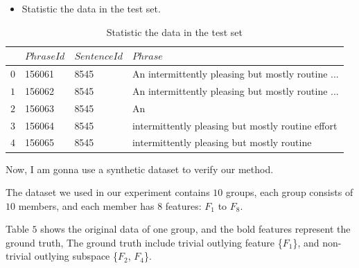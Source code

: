 \documentclass[
 size=14pt,
 paper=smartboard,  %
 mode=present, 		%
 display=slides, 	%
 style=tuliplab,  	%
 pauseslide,
 fleqn,leqno]{powerdot}
\begin{document}
  \begin{slide}{}

    \begin{itemize}
    \item Statistic the data in the test set.
    \end{itemize}
    
    \begin{table}
    \setlength{\abovecaptionskip}{0pt}
    \setlength{\belowcaptionskip}{10pt}
    \centering
    \caption{Statistic the data in the test set}
    
    \begin{tabular}{p{0.5cm}p{2.3cm}p{2.5cm}p{11cm}}
    \hline
        & $PhraseId$ & $SentenceId$ & $Phrase$  \\
    \hline
      $0$   & 156061 & 8545  & An intermittently pleasing but mostly routine ...  \\
      $1$   & 156062  & 8545  &An intermittently pleasing but mostly routine ...   \\
      $2$   & 156063  & 8545 & An   \\
      $3$   & 156064  & 8545  & intermittently pleasing but mostly routine effort  \\
      $4$   & 156065    &8545  & intermittently pleasing but mostly routine  \\
      
      
      
    \hline
    \end{tabular}
    \end{table}
    
    \begin{note}
    Now,
    I am gonna use a synthetic dataset to verify our method.
    
    The dataset we used in our experiment contains $10$ groups,
    each group consists of $10$ members,
    and each member has $8$ features: $F_1$ to $F_8$.
    
    Table $5$ shows the original data of one group,
    and the bold features represent the ground truth,
    The ground truth include trivial outlying feature \{$F_1$\},
    and non-trivial outlying subspace \{$F_2$, $F_4$\}.
    \end{note}
    
    \end{slide}
\end{document}
